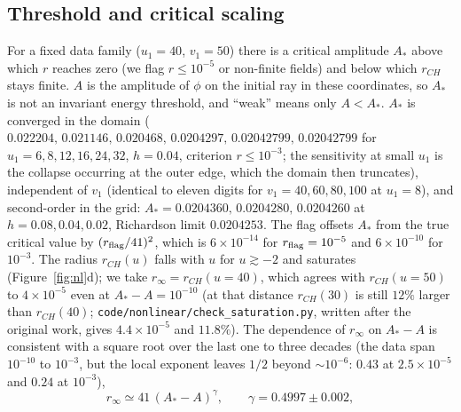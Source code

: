 \documentclass[11pt]{article}
\begin{document}
\subsection{Threshold and critical scaling}

For a fixed data family ($u_1=40$, $v_1=50$) there is a critical amplitude $A_*$ above which $r$ reaches zero (we flag $r\le10^{-5}$ or non-finite fields) and below which $r_{CH}$ stays finite. $A$ is the amplitude of $\phi$ on the initial ray in these coordinates, so $A_*$ is not an invariant energy threshold, and ``weak'' means only $A<A_*$. $A_*$ is converged in the domain ($0.022204,\,0.021146,\,0.020468,\,0.0204297,\,0.02042799,\,0.02042799$ for $u_1=6,8,12,16,24,32$, $h=0.04$, criterion $r\le10^{-3}$; the sensitivity at small $u_1$ is the collapse occurring at the outer edge, which the domain then truncates), independent of $v_1$ (identical to eleven digits for $v_1=40,60,80,100$ at $u_1=8$), and second-order in the grid: $A_*=0.0204360,\,0.0204280,\,0.0204260$ at $h=0.08,0.04,0.02$, Richardson limit $0.0204253$. The flag offsets $A_*$ from the true critical value by $(r_{\rm flag}/41)^2$, which is $6\times10^{-14}$ for $r_{\rm flag}=10^{-5}$ and $6\times10^{-10}$ for $10^{-3}$. The radius $r_{CH}(u)$ falls with $u$ for $u\gtrsim-2$ and saturates (Figure~\ref{fig:nl}d); we take $r_\infty=r_{CH}(u{=}40)$, which agrees with $r_{CH}(u{=}50)$ to $4\times10^{-5}$ even at $A_*-A=10^{-10}$ (at that distance $r_{CH}(30)$ is still $12\%$ larger than $r_{CH}(40)$; \texttt{code/nonlinear/check\_saturation.py}, written after the original work, gives $4.4\times10^{-5}$ and $11.8\%$). The dependence of $r_\infty$ on $A_*-A$ is consistent with a square root over the last one to three decades (the data span $10^{-10}$ to $10^{-3}$, but the local exponent leaves $1/2$ beyond $\sim10^{-6}$: $0.43$ at $2.5\times10^{-5}$ and $0.24$ at $10^{-3}$),
\begin{equation}
r_\infty\simeq41\,(A_*-A)^{\gamma},\qquad \gamma=0.4997\pm0.002,
\label{eq:gamma}
\end{equation}
\end{document}
